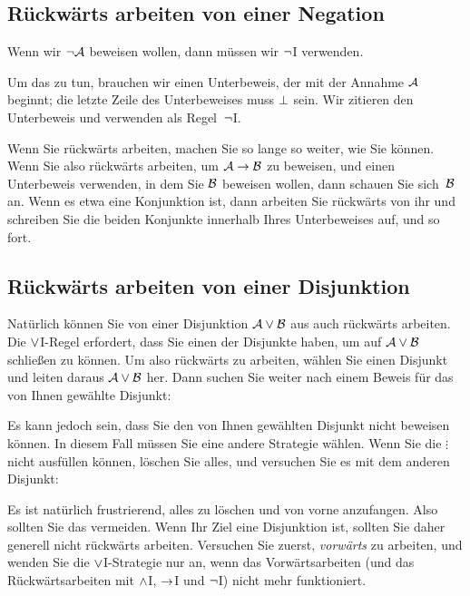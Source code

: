 \subsection*{Rückwärts arbeiten von einer Negation}

Wenn wir $\neg \mathcal{A}$ beweisen wollen, dann müssen wir $\neg$I verwenden.
\begin{fitchproof}
\open
{}
\ellipsesline 
{}
\close
{}
\end{fitchproof} 
Um das zu tun, brauchen wir einen Unterbeweis, der mit der Annahme $\mathcal{A}$ beginnt; die letzte Zeile des Unterbeweises muss $\bot$ sein. Wir zitieren den Unterbeweis und verwenden als Regel~$\neg$I.

Wenn Sie rückwärts arbeiten, machen Sie so lange so weiter, wie Sie können. Wenn Sie also rückwärts arbeiten, um $\mathcal{A} \rightarrow \mathcal{B}$ zu beweisen, und einen Unterbeweis verwenden, in dem Sie $\mathcal{B}$ beweisen wollen, dann schauen Sie sich~$\mathcal{B}$ an. Wenn es etwa eine Konjunktion ist, dann arbeiten Sie rückwärts von ihr und schreiben Sie die beiden Konjunkte innerhalb Ihres Unterbeweises auf, und so fort.

\subsection*{Rückwärts arbeiten von einer Disjunktion}

Natürlich können Sie von einer Disjunktion $\mathcal{A} \vee \mathcal{B}$ aus auch rückwärts arbeiten. Die $\vee$I-Regel erfordert, dass Sie einen der Disjunkte haben, um auf $\mathcal{A} \vee \mathcal{B}$ schlie{\ss}en zu können. Um also rückwärts zu arbeiten, wählen Sie einen Disjunkt und leiten daraus $\mathcal{A} \vee \mathcal{B}$ her. Dann suchen Sie weiter nach einem Beweis für das von Ihnen gewählte Disjunkt:
\begin{fitchproof}
	\ellipsesline
\end{fitchproof}
Es kann jedoch sein, dass Sie den von Ihnen gewählten Disjunkt nicht beweisen können. In diesem Fall müssen Sie eine andere Strategie wählen. Wenn Sie die $\vdots$ nicht ausfüllen können, löschen Sie alles, und versuchen Sie es mit dem anderen Disjunkt:
\begin{fitchproof}
	\ellipsesline 
\end{fitchproof}
Es ist natürlich frustrierend, alles zu löschen und von vorne anzufangen. Also sollten Sie das vermeiden. Wenn Ihr Ziel eine Disjunktion ist, sollten Sie daher generell nicht rückwärts arbeiten. Versuchen Sie zuerst, \emph{vorwärts} zu arbeiten, und wenden Sie die $\vee$I-Strategie nur an, wenn das Vorwärtsarbeiten (und das Rückwärtsarbeiten mit $\wedge$I, $\rightarrow$I und $\neg$I) nicht mehr funktioniert.

